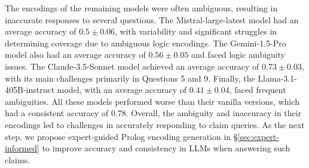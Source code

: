The encodings of the remaining models were often ambiguous, resulting in inaccurate responses to several questions. The Mistral-large-latest model had an average accuracy of $0.5 \pm 0.06$, with variability and significant struggles in determining coverage due to ambiguous logic encodings. The Gemini-1.5-Pro model also had an average accuracy of $0.56 \pm 0.05$ and faced logic ambiguity issues. 
The Claude-3.5-Sonnet model achieved an average accuracy of $0.73 \pm 0.03$, with its main challenges primarily in Questions 5 and 9. Finally, the Llama-3.1-405B-instruct model, with an average accuracy of $0.41 \pm 0.04$, faced frequent ambiguities. All these models performed worse than their vanilla versions, which had a consistent accuracy of $0.78$. Overall, the ambiguity and inaccuracy in their encodings led to challenges in accurately responding to claim queries. As the next step, we propose expert-guided Prolog encoding generation in \S\ref{sec:expert-informed} to improve accuracy and consistency in LLMs when answering such claims.




